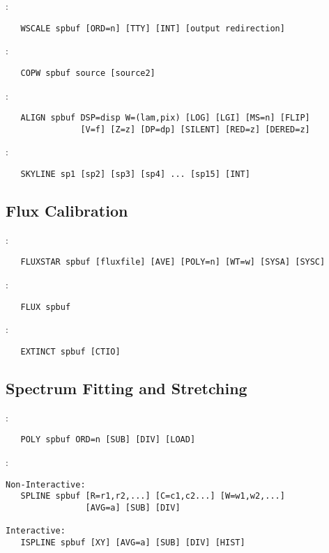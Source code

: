 \noindent {}:
\begin{verbatim}
   WSCALE spbuf [ORD=n] [TTY] [INT] [output redirection]
\end{verbatim}

\noindent {}:
\begin{verbatim}
   COPW spbuf source [source2]
\end{verbatim}

\noindent {}:
\begin{verbatim}
   ALIGN spbuf DSP=disp W=(lam,pix) [LOG] [LGI] [MS=n] [FLIP]
               [V=f] [Z=z] [DP=dp] [SILENT] [RED=z] [DERED=z]
\end{verbatim}

\noindent {}:
\begin{verbatim}
   SKYLINE sp1 [sp2] [sp3] [sp4] ... [sp15] [INT]
\end{verbatim}

\subsection{Flux Calibration}

:
\begin{verbatim}
   FLUXSTAR spbuf [fluxfile] [AVE] [POLY=n] [WT=w] [SYSA] [SYSC]
\end{verbatim}

\noindent {}:
\begin{verbatim}
   FLUX spbuf
\end{verbatim}

\noindent {}:
\begin{verbatim}
   EXTINCT spbuf [CTIO]
\end{verbatim}

\subsection{Spectrum Fitting and Stretching}

:
\begin{verbatim}
   POLY spbuf ORD=n [SUB] [DIV] [LOAD]
\end{verbatim}

\noindent {}:
\begin{verbatim}
Non-Interactive:
   SPLINE spbuf [R=r1,r2,...] [C=c1,c2...] [W=w1,w2,...]
                [AVG=a] [SUB] [DIV]

Interactive:
   ISPLINE spbuf [XY] [AVG=a] [SUB] [DIV] [HIST]
\end{verbatim}

